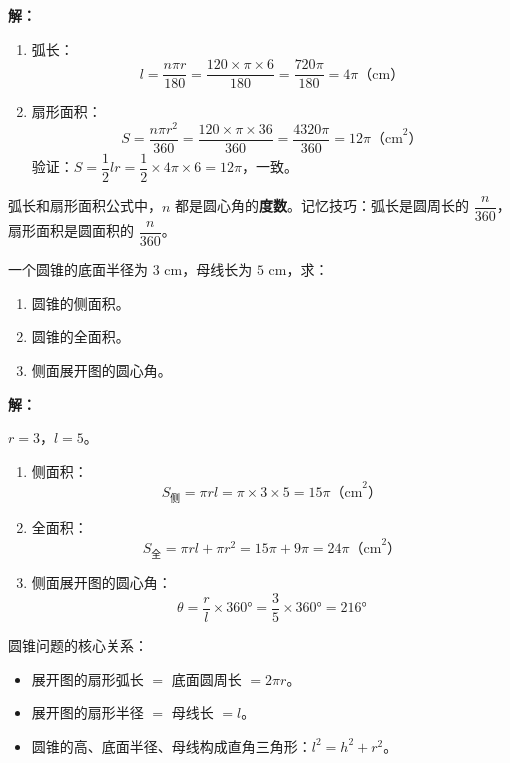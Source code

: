 \documentclass[12pt, a4paper]{ctexart}
\begin{document}
\textbf{解：}
\begin{enumerate}[label=(\arabic*)]
  \item 弧长：
  \[
  l = \frac{n\pi r}{180} = \frac{120 \times \pi \times 6}{180} = \frac{720\pi}{180} = 4\pi \text{（cm）}
  \]
  \item 扇形面积：
  \[
  S = \frac{n\pi r^2}{360} = \frac{120 \times \pi \times 36}{360} = \frac{4320\pi}{360} = 12\pi \text{（cm}^2\text{）}
  \]
  验证：$S = \dfrac{1}{2}lr = \dfrac{1}{2} \times 4\pi \times 6 = 12\pi$，一致。
\end{enumerate}

\begin{tipbox}[方法总结]
弧长和扇形面积公式中，$n$ 都是圆心角的\textbf{度数}。记忆技巧：弧长是圆周长的 $\dfrac{n}{360}$，扇形面积是圆面积的 $\dfrac{n}{360}$。
\end{tipbox}

\vspace{6pt}

\begin{examplebox}[【例题7】圆锥的侧面积计算]
一个圆锥的底面半径为 $3$ cm，母线长为 $5$ cm，求：
\begin{enumerate}[label=(\arabic*)]
  \item 圆锥的侧面积。
  \item 圆锥的全面积。
  \item 侧面展开图的圆心角。
\end{enumerate}
\end{examplebox}

\textbf{解：}

$r = 3$，$l = 5$。
\begin{enumerate}[label=(\arabic*)]
  \item 侧面积：
  \[
  S_{\text{侧}} = \pi r l = \pi \times 3 \times 5 = 15\pi \text{（cm}^2\text{）}
  \]
  \item 全面积：
  \[
  S_{\text{全}} = \pi r l + \pi r^2 = 15\pi + 9\pi = 24\pi \text{（cm}^2\text{）}
  \]
  \item 侧面展开图的圆心角：
  \[
  \theta = \frac{r}{l} \times 360° = \frac{3}{5} \times 360° = 216°
  \]
\end{enumerate}

\begin{tipbox}[方法总结]
圆锥问题的核心关系：
\begin{itemize}[nosep]
  \item 展开图的扇形弧长 $=$ 底面圆周长 $= 2\pi r$。
  \item 展开图的扇形半径 $=$ 母线长 $= l$。
  \item 圆锥的高、底面半径、母线构成直角三角形：$l^2 = h^2 + r^2$。
\end{itemize}
\end{tipbox}
\end{document}
